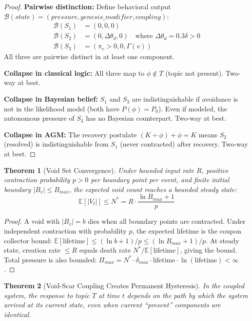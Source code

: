 \documentclass[11pt]{article}
\newtheorem{theorem}{Theorem}[section]
\begin{document}
\begin{proof}
\textbf{Pairwise distinction:} Define behavioral output $\mathcal{B}(state) = (pressure, genesis\_modifier, coupling)$:
\begin{align}
\mathcal{B}(S_1) &= (0, 0, 0) \\
\mathcal{B}(S_2) &= (0, \Delta\theta_d, 0) \quad \text{where } \Delta\theta_d = 0.3\delta > 0 \\
\mathcal{B}(S_3) &= (\pi_v > 0, 0, \Gamma(v))
\end{align}
All three are pairwise distinct in at least one component.

\textbf{Collapse in classical logic:} All three map to $\phi \notin T$ (topic not present). Two-way at best.

\textbf{Collapse in Bayesian belief:} $S_1$ and $S_3$ are indistinguishable if avoidance is not in the likelihood model (both have $P(\phi) = P_0$). Even if modeled, the autonomous pressure of $S_3$ has no Bayesian counterpart. Two-way at best.

\textbf{Collapse in AGM:} The recovery postulate $(K \div \phi) + \phi = K$ means $S_2$ (resolved) is indistinguishable from $S_1$ (never contracted) after recovery. Two-way at best.
\end{proof}

\begin{theorem}[Void Set Convergence]
\label{thm:void-convergence}
Under bounded input rate $R$, positive contraction probability $p > 0$ per boundary point per event, and finite initial boundary $|B_v| \leq B_{max}$, the expected void count reaches a bounded steady state:
\begin{equation}
\mathbb{E}[|V_t|] \leq N^* = R \cdot \frac{\ln B_{max} + 1}{p}
\end{equation}
\end{theorem}

\begin{proof}
A void with $|B_v| = b$ dies when all boundary points are contracted. Under independent contraction with probability $p$, the expected lifetime is the coupon collector bound: $\mathbb{E}[\text{lifetime}] \leq (\ln b + 1)/p \leq (\ln B_{max} + 1)/p$. At steady state, creation rate $\leq R$ equals death rate $N^*/\mathbb{E}[\text{lifetime}]$, giving the bound. Total pressure is also bounded: $\Pi_{max} = N^* \cdot \delta_{max} \cdot \text{lifetime} \cdot \ln(\text{lifetime}) < \infty$.
\end{proof}

\begin{theorem}[Void-Scar Coupling Creates Permanent Hysteresis]
\label{thm:void-hysteresis}
In the coupled system, the response to topic $T$ at time $t$ depends on the path by which the system arrived at its current state, even when current ``present'' components are identical.
\end{theorem}
\end{document}
